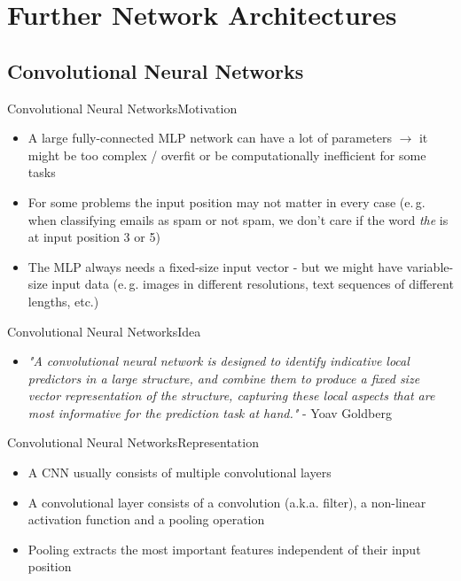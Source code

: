 \section{Further Network Architectures}

\subsection{Convolutional Neural Networks}

\begin{frame}{Convolutional Neural Networks}{Motivation}
	\begin{itemize}
		\item A large fully-connected MLP network can have a lot of parameters $\rightarrow$ it might be too complex / overfit or be computationally inefficient for some tasks
		\item For some problems the input position may not matter in every case (e.\,g. when classifying emails as spam or not spam, we don't care if the word \textit{the} is at input position 3 or 5)
		\item The MLP always needs a fixed-size input vector - but we might have variable-size input data (e.\,g. images in different resolutions, text sequences of different lengths, etc.)
	\end{itemize}
\end{frame}

\begin{frame}{Convolutional Neural Networks}{Idea}
	\begin{itemize}
		\item \textit{"A convolutional neural network is designed to identify indicative local predictors in a large structure, and combine them to produce a fixed size vector representation of the structure, capturing these local aspects that are most informative for the prediction task at hand."} - Yoav Goldberg
	\end{itemize}
\end{frame}

\begin{frame}{Convolutional Neural Networks}{Representation}
	\begin{itemize}
		\item A CNN usually consists of multiple convolutional layers
		\item A convolutional layer consists of a convolution (a.k.a. filter), a non-linear activation function and a pooling operation
		\item Pooling extracts the most important features independent of their input position
	\end{itemize}
\end{frame}

